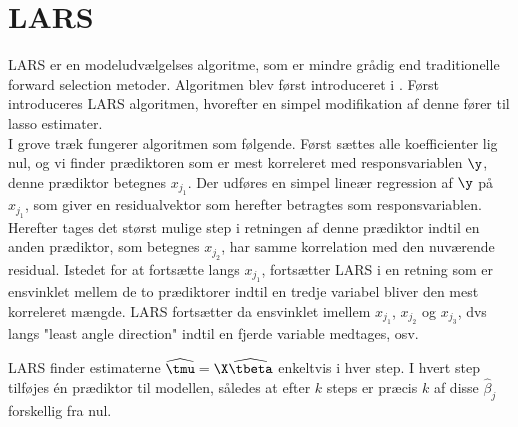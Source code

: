 \section{LARS}
LARS er en modeludvælgelses algoritme, som er mindre grådig end traditionelle forward selection metoder. 
Algoritmen blev først introduceret i \citep{efron}. 
Først introduceres LARS algoritmen, hvorefter en simpel modifikation af denne fører til lasso estimater. \\[2mm]
%
I grove træk fungerer algoritmen som følgende. 
Først sættes alle koefficienter lig nul, og vi finder prædiktoren som er mest korreleret med responsvariablen \(\y\), denne prædiktor betegnes \(x_{j_1}\).
Der udføres en simpel lineær regression af \(\y\) på \(x_{j_1}\), som giver en residualvektor som herefter betragtes som responsvariablen.
Herefter tages det størst mulige step i retningen af denne prædiktor indtil en anden prædiktor, som betegnes \(x_{j_2}\), har samme korrelation med den nuværende residual.
Istedet for at fortsætte langs \(x_{j_1}\), fortsætter LARS i en retning som er ensvinklet mellem de to prædiktorer indtil en tredje variabel bliver den mest korreleret mængde.
LARS fortsætter da ensvinklet imellem \(x_{j_1}\), \(x_{j_2}\) og \(x_{j_3}\), dvs langs "least angle direction" indtil en fjerde variable medtages, osv.

LARS finder estimaterne \(\widehat{\tmu} = \X \widehat{\tbeta}\) enkeltvis i hver step.
I hvert step tilføjes én prædiktor til modellen, således at efter \(k\) steps er præcis \(k\) af disse \(\hat{\beta}_j\) forskellig fra nul.


